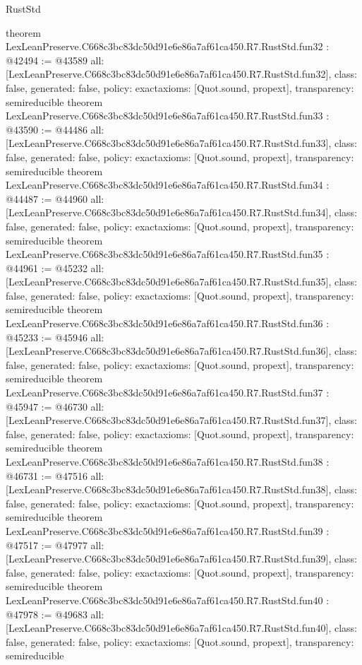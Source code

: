 \begin{lexlean}{RustStd}
\begin{coremodule}
{}
theorem LexLeanPreserve.C668c3bc83dc50d91e6e86a7af61ca450.R7.RustStd.fun32 : @42494 := @43589 {
  all: [LexLeanPreserve.C668c3bc83dc50d91e6e86a7af61ca450.R7.RustStd.fun32],
  class: false,
  generated: false,
  policy: exact{axioms: [Quot.sound, propext]},
  transparency: semireducible
}
theorem LexLeanPreserve.C668c3bc83dc50d91e6e86a7af61ca450.R7.RustStd.fun33 : @43590 := @44486 {
  all: [LexLeanPreserve.C668c3bc83dc50d91e6e86a7af61ca450.R7.RustStd.fun33],
  class: false,
  generated: false,
  policy: exact{axioms: [Quot.sound, propext]},
  transparency: semireducible
}
theorem LexLeanPreserve.C668c3bc83dc50d91e6e86a7af61ca450.R7.RustStd.fun34 : @44487 := @44960 {
  all: [LexLeanPreserve.C668c3bc83dc50d91e6e86a7af61ca450.R7.RustStd.fun34],
  class: false,
  generated: false,
  policy: exact{axioms: [Quot.sound, propext]},
  transparency: semireducible
}
theorem LexLeanPreserve.C668c3bc83dc50d91e6e86a7af61ca450.R7.RustStd.fun35 : @44961 := @45232 {
  all: [LexLeanPreserve.C668c3bc83dc50d91e6e86a7af61ca450.R7.RustStd.fun35],
  class: false,
  generated: false,
  policy: exact{axioms: [Quot.sound, propext]},
  transparency: semireducible
}
theorem LexLeanPreserve.C668c3bc83dc50d91e6e86a7af61ca450.R7.RustStd.fun36 : @45233 := @45946 {
  all: [LexLeanPreserve.C668c3bc83dc50d91e6e86a7af61ca450.R7.RustStd.fun36],
  class: false,
  generated: false,
  policy: exact{axioms: [Quot.sound, propext]},
  transparency: semireducible
}
theorem LexLeanPreserve.C668c3bc83dc50d91e6e86a7af61ca450.R7.RustStd.fun37 : @45947 := @46730 {
  all: [LexLeanPreserve.C668c3bc83dc50d91e6e86a7af61ca450.R7.RustStd.fun37],
  class: false,
  generated: false,
  policy: exact{axioms: [Quot.sound, propext]},
  transparency: semireducible
}
theorem LexLeanPreserve.C668c3bc83dc50d91e6e86a7af61ca450.R7.RustStd.fun38 : @46731 := @47516 {
  all: [LexLeanPreserve.C668c3bc83dc50d91e6e86a7af61ca450.R7.RustStd.fun38],
  class: false,
  generated: false,
  policy: exact{axioms: [Quot.sound, propext]},
  transparency: semireducible
}
theorem LexLeanPreserve.C668c3bc83dc50d91e6e86a7af61ca450.R7.RustStd.fun39 : @47517 := @47977 {
  all: [LexLeanPreserve.C668c3bc83dc50d91e6e86a7af61ca450.R7.RustStd.fun39],
  class: false,
  generated: false,
  policy: exact{axioms: [Quot.sound, propext]},
  transparency: semireducible
}
theorem LexLeanPreserve.C668c3bc83dc50d91e6e86a7af61ca450.R7.RustStd.fun40 : @47978 := @49683 {
  all: [LexLeanPreserve.C668c3bc83dc50d91e6e86a7af61ca450.R7.RustStd.fun40],
  class: false,
  generated: false,
  policy: exact{axioms: [Quot.sound, propext]},
  transparency: semireducible
}
\end{coremodule}
\end{lexlean}
